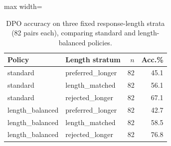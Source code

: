 \begin{table}[!htbp]
\centering
\caption{DPO accuracy on three fixed response-length strata (82 pairs each), comparing standard and length-balanced policies.}
\label{tab:dpo-strata}
\scriptsize
\setlength{\tabcolsep}{3.4pt}
\begin{adjustbox}{max width=\linewidth}
\begin{tabular}{llrr}
\toprule
Policy & Length stratum & $n$ & Acc.\% \\
\midrule
standard & preferred\_longer & 82 & 45.1 \\
standard & length\_matched & 82 & 56.1 \\
standard & rejected\_longer & 82 & 67.1 \\
length\_balanced & preferred\_longer & 82 & 42.7 \\
length\_balanced & length\_matched & 82 & 58.5 \\
length\_balanced & rejected\_longer & 82 & 76.8 \\
\bottomrule
\end{tabular}
\end{adjustbox}
\end{table}
